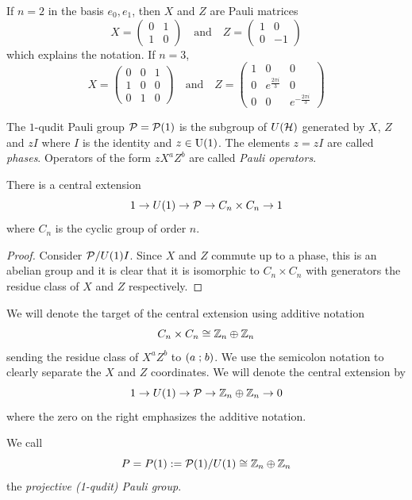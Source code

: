 \documentclass[11pt]{amsart}
\begin{document}
\begin{example}
If $n=2$ in the basis $e_0,e_1$, then $X$ and $Z$ are Pauli matrices
\[X = \begin{pmatrix}  0  & 1 \\ 1 & 0 \end{pmatrix}  \quad \text{and} \quad Z= \begin{pmatrix} 1 & 0 \\ 0 & -1 \end{pmatrix} \]
which explains the notation.
If $n=3$,
\[X = \begin{pmatrix}  0  &  0 & 1 \\ 1 & 0 & 0 \\ 0 & 1 & 0  \end{pmatrix}  \quad \text{and} \quad Z= \begin{pmatrix}  1 & 0  & 0 \\ 0 & e^{\frac{2\pi i}{3}} & 0 \\ 0 & 0 & e^{-\frac{2 \pi i}{3}}   \end{pmatrix} \]
\end{example}

\begin{defn}
The $1$-qudit Pauli group $\mathcal{P}= \mathcal{P}(1)$ is the subgroup of $U(\mathcal{H})$ generated by $X$, $Z$ and $z I$ where $I$ is the identity and $z\in \rm U(1)$. The elements $z=zI$ are called \emph{phases}. Operators of the form $zX^aZ^b$ are called \emph{Pauli operators}.
\end{defn}
\begin{lem}
There is a central extension
\[ 1 \to U(1) \to \mathcal{P} \to C_n \times C_n\to 1\]
where $C_n$ is the cyclic group of order $n$.
\end{lem}
\begin{proof}
Consider $\mathcal{P}/U(1) I$. Since $X$ and $Z$ commute up to a phase, this is an abelian group and it is clear that it is isomorphic to $C_n \times C_n$ with generators the residue class of $X$ and $Z$ respectively.
\end{proof}


\begin{rem}
We will denote the target of the central extension using additive notation
\[C_n \times C_n \cong \mathbb{Z}_n\oplus \mathbb{Z}_n\]
sending the residue class of $X^aZ^b$ to $(a \mathrel{;}  b)$. We use the semicolon notation to clearly separate the $X$ and $Z$ coordinates. We will denote the central extension by
\[ 1 \to U(1) \to \mathcal{P} \to \mathbb{Z}_n\oplus \mathbb{Z}_n \to 0\]
where the zero on the right emphasizes the additive notation.
\end{rem}
\begin{defn}
We call
\[ P = P(1) := \mathcal{P}(1)/U(1) \cong  \mathbb{Z}_n\oplus \mathbb{Z}_n\]
the \emph{projective  (1-qudit) Pauli group}.
\end{defn}
\end{document}
